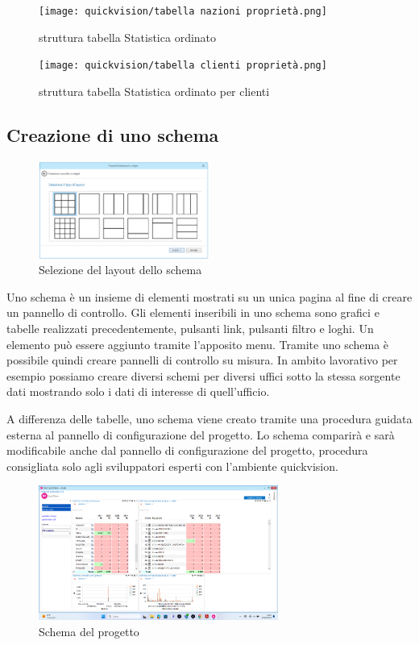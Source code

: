 \documentclass[target=bach,aauheader=,style=]{thud}
\begin{document}
\begin{figure}[H]
    \centering
    \begin{minipage}{0.45\textwidth}
        \centering
        \texttt{[image: quickvision/tabella nazioni proprietà.png]}
        \caption{struttura tabella Statistica ordinato}
    \end{minipage}
    \hfill
    \begin{minipage}{0.45\textwidth}
        \centering
        \texttt{[image: quickvision/tabella clienti proprietà.png]}
        \caption{struttura tabella Statistica ordinato per clienti}
    \end{minipage}
\end{figure}


\subsection{Creazione di uno schema}

\begin{figure}
    \centering
    \includegraphics[width=0.5\textwidth]{quickvision/configurazione schema.png}
    \caption{Selezione del layout dello schema}
\end{figure}

Uno schema è un insieme di elementi mostrati su un unica pagina al fine di creare un pannello di controllo.
Gli elementi inseribili in uno schema sono grafici e tabelle realizzati precedentemente, pulsanti link, pulsanti filtro e loghi. Un elemento può essere aggiunto tramite l'apposito menu.
Tramite uno schema è possibile quindi creare pannelli di controllo su misura.
In ambito lavorativo per esempio possiamo creare diversi schemi per diversi uffici sotto la stessa sorgente dati mostrando solo i dati di interesse di quell'ufficio.

A differenza delle tabelle, uno schema viene creato tramite una procedura guidata esterna al pannello di configurazione del progetto.
Lo schema comparirà e sarà modificabile anche dal pannello di configurazione del progetto, procedura consigliata solo agli sviluppatori esperti con l'ambiente quickvision.
\begin{figure}[H]
    \centering
    \includegraphics[width=0.7\textwidth]{quickvision/schema.png}
    \caption{Schema del progetto}
\end{figure}
\end{document}
